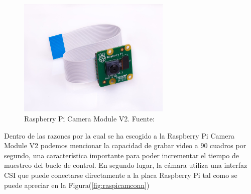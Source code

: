         \begin{figure}[!h] 
            \centering
            \includegraphics[width=0.65\textwidth]{img/raspicam}
            \caption[Raspberry Pi Camera Module V2]{Raspberry Pi Camera Module V2. Fuente: \cite{raspicam} }
            \label{fig:raspicam}
        \end{figure}

        \begin{table}[!h]
            \centering
            \caption{Características de la Raspberry Pi Camera Module V2. Fuente: \cite{raspicam}}
            \label{tbl:raspicamspecs}
            \end{table}
        
        Dentro de las razones por la cual se ha escogido a la Raspberry Pi Camera Module V2 podemos mencionar la capacidad de 
        grabar video a 90 cuadros por segundo, una característica importante para poder incrementar el tiempo de muestreo del 
        bucle de control. En segundo lugar, la cámara utiliza una interfaz CSI que puede conectarse directamente a la placa Raspberry
        Pi tal como se puede apreciar en la Figura(\ref{fig:raspicamconn})
        
